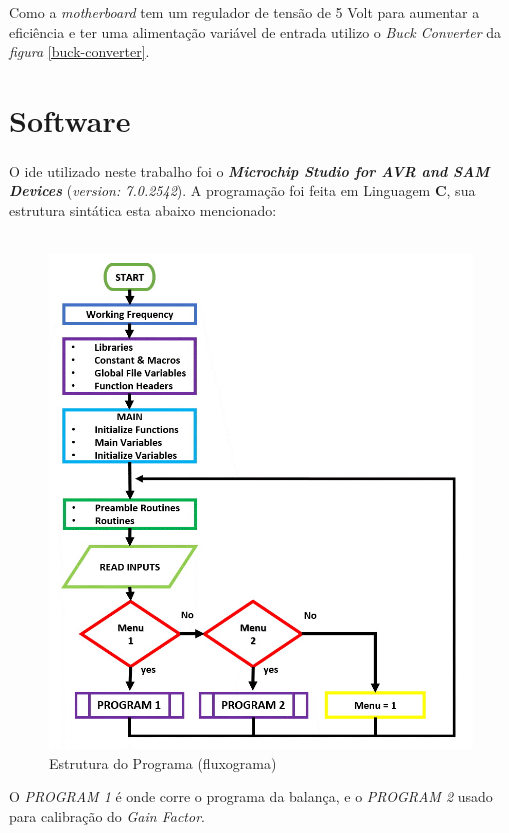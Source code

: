 Como a \textit{motherboard} tem um regulador de tensão de 5 Volt para aumentar a eficiência  e ter uma alimentação variável de entrada utilizo o \textit{Buck Converter} da \textit{figura} \ref{buck-converter}.
\chapter{Software}
O \ac{ide} utilizado neste trabalho foi o \textbf{\textit{{Microchip Studio for AVR\textsuperscript{\textregistered} and SAM Devices}}} (\textit{version: 7.0.2542}). A programação foi feita em Linguagem \textbf{C}, sua estrutura sintática esta abaixo mencionado:
\\
\\
\begin{figure}[H]
	\centering
	\includegraphics[scale=0.6]{./image/PESTA/flowchart/Main_Program_1.jpg}
	\caption{Estrutura do Programa (fluxograma)}
	\label{Main_Program_1}
\end{figure}
O \textit{PROGRAM 1} é onde corre o programa da balança, e o \textit{PROGRAM 2} usado para calibração do \textit{Gain Factor}.
\\
\\
